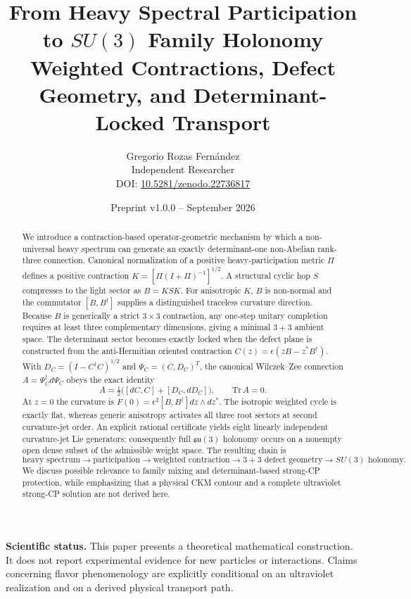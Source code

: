 \documentclass[11pt]{article}
\title{\textbf{From Heavy Spectral Participation to $SU(3)$ Family Holonomy}\\\large Weighted Contractions, Defect Geometry, and Determinant-Locked Transport}
\author{Gregorio Rozas Fernández\\\small Independent Researcher\\\small DOI: \href{https://doi.org/10.5281/zenodo.22736817}{10.5281/zenodo.22736817}}
\date{Preprint v1.0.0 -- September 2026}
\theoremstyle{remark}\newtheorem{remark}{Remark}
\begin{document}
\maketitle

\begin{abstract}
We introduce a contraction-based operator-geometric mechanism by which a non-universal heavy spectrum can generate an exactly determinant-one non-Abelian rank-three connection. Canonical normalization of a positive heavy-participation metric $\Pi$ defines a positive contraction $K=[\Pi(I+\Pi)^{-1}]^{1/2}$. A structural cyclic hop $S$ compresses to the light sector as $B=KSK$. For anisotropic $K$, $B$ is non-normal and the commutator $[B,B^\dagger]$ supplies a distinguished traceless curvature direction. Because $B$ is generically a strict $3\times 3$ contraction, any one-step unitary completion requires at least three complementary dimensions, giving a minimal $3+3$ ambient space. The determinant sector becomes exactly locked when the defect plane is constructed from the anti-Hermitian oriented contraction $C(z)=\epsilon(zB-z^*B^\dagger)$. With $D_C=(I-C^\dagger C)^{1/2}$ and $\Psi_C=(C,D_C)^T$, the canonical Wilczek--Zee connection $A=\Psi_C^\dagger d\Psi_C$ obeys the exact identity
\[
A=\tfrac12\big([dC,C]+[D_C,dD_C]\big),\qquad \mathrm{Tr}\,A=0.
\]
At $z=0$ the curvature is $F(0)=\epsilon^2[B,B^\dagger]dz\wedge dz^*$. The isotropic weighted cycle is exactly flat, whereas generic anisotropy activates all three root sectors at second curvature-jet order. An explicit rational certificate yields eight linearly independent curvature-jet Lie generators; consequently full $\mathfrak{su}(3)$ holonomy occurs on a nonempty open dense subset of the admissible weight space. The resulting chain is
\[
\text{heavy spectrum}\to\text{participation}\to\text{weighted contraction}\to 3+3\text{ defect geometry}\to SU(3)\text{ holonomy}.
\]
We discuss possible relevance to family mixing and determinant-based strong-CP protection, while emphasizing that a physical CKM contour and a complete ultraviolet strong-CP solution are not derived here.
\end{abstract}

\noindent\textbf{Scientific status.} This paper presents a theoretical mathematical construction. It does not report experimental evidence for new particles or interactions. Claims concerning flavor phenomenology are explicitly conditional on an ultraviolet realization and on a derived physical transport path.
\end{document}
